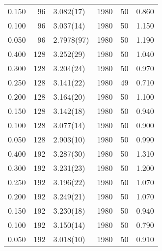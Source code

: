 \begin{tabular}{rrlrrr}
 0.150 &      96 & 3.082(17)  &                 1980 &                   50 &    0.860 \\
 0.100 &      96 & 3.037(14)  &                 1980 &                   50 &    1.150 \\
 0.050 &      96 & 2.7978(97) &                 1980 &                   50 &    1.190 \\
 0.400 &     128 & 3.252(29)  &                 1980 &                   50 &    1.040 \\
 0.300 &     128 & 3.204(24)  &                 1980 &                   50 &    0.970 \\
 0.250 &     128 & 3.141(22)  &                 1980 &                   49 &    0.710 \\
 0.200 &     128 & 3.164(20)  &                 1980 &                   50 &    1.100 \\
 0.150 &     128 & 3.142(18)  &                 1980 &                   50 &    0.940 \\
 0.100 &     128 & 3.077(14)  &                 1980 &                   50 &    0.900 \\
 0.050 &     128 & 2.903(10)  &                 1980 &                   50 &    0.990 \\
 0.400 &     192 & 3.287(30)  &                 1980 &                   50 &    1.310 \\
 0.300 &     192 & 3.231(23)  &                 1980 &                   50 &    1.200 \\
 0.250 &     192 & 3.196(22)  &                 1980 &                   50 &    1.070 \\
 0.200 &     192 & 3.249(21)  &                 1980 &                   50 &    1.070 \\
 0.150 &     192 & 3.230(18)  &                 1980 &                   50 &    0.940 \\
 0.100 &     192 & 3.150(14)  &                 1980 &                   50 &    0.790 \\
 0.050 &     192 & 3.018(10)  &                 1980 &                   50 &    0.910 \\
\hline
\end{tabular}
